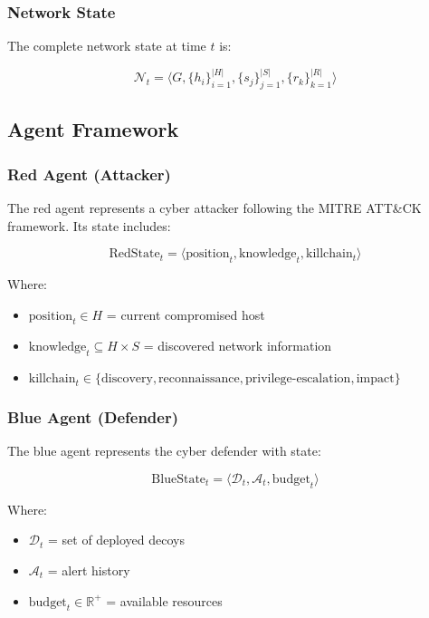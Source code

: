 \documentclass[12pt,a4paper]{article}
\begin{document}
\subsubsection{Network State}
The complete network state at time $t$ is:

\begin{equation}
\mathcal{N}_t = \langle G, \{h_i\}_{i=1}^{|H|}, \{s_j\}_{j=1}^{|S|}, \{r_k\}_{k=1}^{|R|} \rangle
\end{equation}

\subsection{Agent Framework}

\subsubsection{Red Agent (Attacker)}
The red agent represents a cyber attacker following the MITRE ATT\&CK framework. Its state includes:

\begin{equation}
\text{RedState}_t = \langle \text{position}_t, \text{knowledge}_t, \text{killchain}_t \rangle
\end{equation}

Where:
\begin{itemize}
    \item $\text{position}_t \in H$ = current compromised host
    \item $\text{knowledge}_t \subseteq H \times S$ = discovered network information
    \item $\text{killchain}_t \in \{\text{discovery}, \text{reconnaissance}, \text{privilege-escalation}, \text{impact}\}$
\end{itemize}

\subsubsection{Blue Agent (Defender)}
The blue agent represents the cyber defender with state:

\begin{equation}
\text{BlueState}_t = \langle \mathcal{D}_t, \mathcal{A}_t, \text{budget}_t \rangle
\end{equation}

Where:
\begin{itemize}
    \item $\mathcal{D}_t$ = set of deployed decoys
    \item $\mathcal{A}_t$ = alert history
    \item $\text{budget}_t \in \mathbb{R}^+$ = available resources
\end{itemize}
\end{document}

